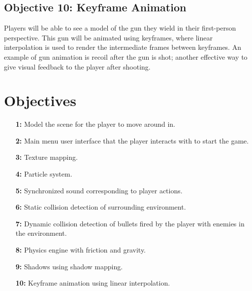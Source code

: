 \documentclass {article}
\begin{document}
\subsection{Objective 10: Keyframe Animation}
Players will be able to see a model of the gun they wield in their first-person perspective. This gun will be animated using keyframes, where linear interpolation is used to render the intermediate frames between keyframes. An example of gun animation is recoil after the gun is shot; another effective way to give visual feedback to the player after shooting.

\newpage
\printbibliography[heading=bibintoc, title={References}] %

\newpage
\appendix
\section{Objectives}\label{sec:objectives}
\begin{enumerate}
    \item[\textbf{1:}]
    Model the scene for the player to move around in.

    \item[\textbf{2:}]
    Main menu user interface that the player interacts with to start the game.

    \item[\textbf{3:}]
    Texture mapping.

    \item[\textbf{4:}]
    Particle system.

    \item[\textbf{5:}]
    Synchronized sound corresponding to player actions.

    \item[\textbf{6:}]
    Static collision detection of surrounding environment.

    \item[\textbf{7:}]
    Dynamic collision detection of bullets fired by the player with enemies in the environment.

    \item[\textbf{8:}]
    Physics engine with friction and gravity.

    \item[\textbf{9:}]
    Shadows using shadow mapping.

    \item[\textbf{10:}]
    Keyframe animation using linear interpolation.
\end{enumerate}
\end{document}
